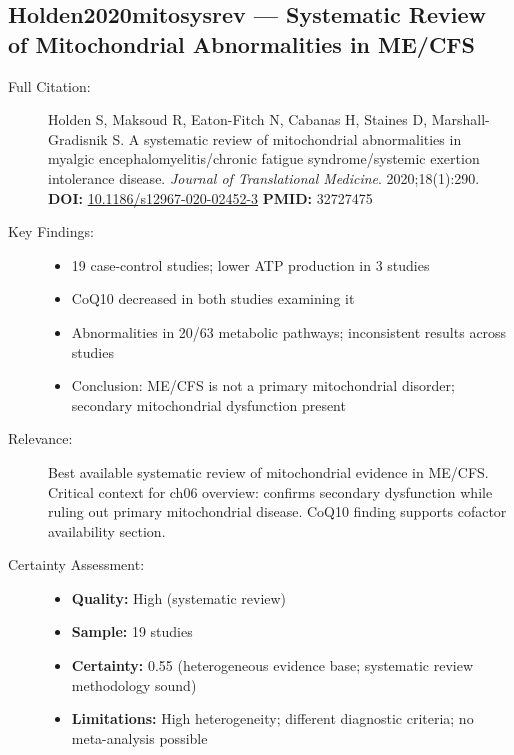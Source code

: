 \subsection*{Holden2020mitosysrev --- Systematic Review of Mitochondrial Abnormalities in ME/CFS}
\begin{description}
    \item[Full Citation:] Holden S, Maksoud R, Eaton-Fitch N, Cabanas H, Staines D, Marshall-Gradisnik S. A systematic review of mitochondrial abnormalities in myalgic encephalomyelitis/chronic fatigue syndrome/systemic exertion intolerance disease. \textit{Journal of Translational Medicine}. 2020;18(1):290.\\
    \textbf{DOI:} \href{https://doi.org/10.1186/s12967-020-02452-3}{10.1186/s12967-020-02452-3} \quad \textbf{PMID:} 32727475
    \item[Key Findings:]
    \begin{itemize}
        \item 19 case-control studies; lower ATP production in 3 studies
        \item CoQ10 decreased in both studies examining it
        \item Abnormalities in 20/63 metabolic pathways; inconsistent results across studies
        \item Conclusion: ME/CFS is not a primary mitochondrial disorder; secondary mitochondrial dysfunction present
    \end{itemize}
    \item[Relevance:] Best available systematic review of mitochondrial evidence in ME/CFS. Critical context for ch06 overview: confirms secondary dysfunction while ruling out primary mitochondrial disease. CoQ10 finding supports cofactor availability section.
    \item[Certainty Assessment:]
    \begin{itemize}
        \item \textbf{Quality:} High (systematic review)
        \item \textbf{Sample:} 19 studies
        \item \textbf{Certainty:} 0.55 (heterogeneous evidence base; systematic review methodology sound)
        \item \textbf{Limitations:} High heterogeneity; different diagnostic criteria; no meta-analysis possible
    \end{itemize}
\end{description}

